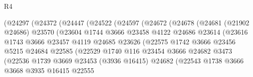 \begin{lexlean}{R4}
\begin{coremodule}
                        (@24297
                          (@24372
                            (@24447
                              (@24522
                                (@24597
                                  (@24672
                                    (@24678
                                      (@24681
                                        (@21902 @24686)
                                        @23570
                                        (@23604
                                          @1744
                                          @3666
                                          @23458
                                          @4122
                                          @24686
                                          @23614
                                          (@23616
                                            @1743
                                            @3666
                                            @23457
                                            @4119
                                            @24685
                                            @23626
                                            (@22575
                                              @1742
                                              @3666
                                              @23456
                                              @5215
                                              @24684
                                              @22585
                                              (@22529
                                                @1740
                                                @116
                                                @23454
                                                @3666
                                                @24682
                                                @3473
                                                (@22536
                                                  @1739
                                                  @3669
                                                  @23453
                                                  (@3936 @16415)
                                                  @24682
                                                  (@22543
                                                    @1738
                                                    @3666
                                                    @3668
                                                    @3935
                                                    @16415
                                                    @22555

\end{coremodule}
\end{lexlean}
